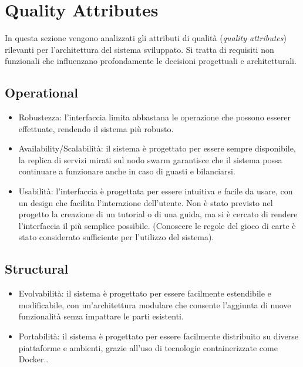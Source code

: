 \chapter{Quality Attributes}
\label{chap:QA}


In questa sezione vengono analizzati gli attributi di qualità (\textit{quality attributes}) rilevanti per l'architettura del sistema sviluppato. Si tratta di requisiti non funzionali che influenzano profondamente le decisioni progettuali e architetturali.

\section{Operational}
\begin{itemize}
  \item Robustezza: l'interfaccia limita abbastana le operazione che possono esserer effettuate, rendendo il sistema più robusto.
  \item Availability/Scalabilità: il sistema è progettato per essere sempre disponibile, la replica di servizi mirati sul nodo swarm garantisce che il sistema possa continuare a funzionare anche in caso di guasti e bilanciarsi.
  \item Usabilità: l'interfaccia è progettata per essere intuitiva e facile da usare, con un design che facilita l'interazione dell'utente. Non è stato previsto nel progetto la creazione di un tutorial o di una guida, ma si è cercato di rendere l'interfaccia il più semplice possibile. (Conoscere le regole del gioco di carte è stato considerato sufficiente per l'utilizzo del sistema).
\end{itemize}


\section{Structural}
\begin{itemize}
    \item Evolvabilità: il sistema è progettato per essere facilmente estendibile e modificabile, con un'architettura modulare che consente l'aggiunta di nuove funzionalità senza impattare le parti esistenti.
    \item Portabilità: il sistema è progettato per essere facilmente distribuito su diverse piattaforme e ambienti, grazie all'uso di tecnologie containerizzate come Docker..
\end{itemize}


